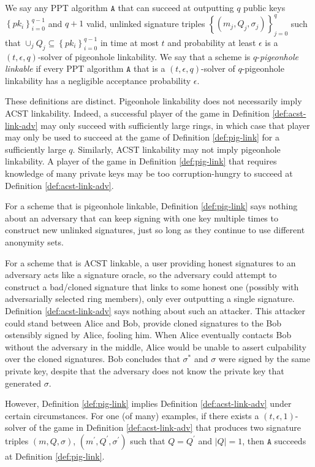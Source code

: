 \documentclass{llncs}
\begin{document}
\begin{definition}\label{def:pig-link}
We say any PPT algorithm $\texttt{A}$ that can succeed at outputting $q$ public keys $\left\{pk_i\right\}_{i=0}^{q-1}$ and $q + 1$ valid, unlinked signature triples $\left\{(m_j, Q_j, \sigma_j)\right\}_{j=0}^{q}$ such that $\cup_j Q_j \subseteq \left\{pk_i\right\}_{i=0}^{q-1}$ in time at most $t$ and probability at least $\epsilon$ is a $(t, \epsilon, q)$-solver of pigeonhole linkability. We say that a scheme is $q$-\textit{pigeonhole linkable} if every PPT algorithm $\texttt{A}$ that is a $(t, \epsilon, q)$-solver of $q$-pigeonhole linkability has a negligible acceptance probability $\epsilon$.
\end{definition}

These definitions are distinct. Pigeonhole linkability does not necessarily imply ACST linkability. Indeed, a successful player of the game in Definition \ref{def:acst-link-adv} may only succeed with sufficiently large rings, in which case that player may only be used to succeed at the game of Definition \ref{def:pig-link} for a sufficiently large $q$. Similarly, ACST linkability may not imply pigeonhole linkability. A player of the game in Definition \ref{def:pig-link} that requires knowledge of many private keys may be too corruption-hungry to succeed at Definition \ref{def:acst-link-adv}.

For a scheme that is pigeonhole linkable, Definition \ref{def:pig-link} says nothing about an adversary that can keep signing with one key multiple times to construct new unlinked signatures, just so long as they continue to use different anonymity sets.

For a scheme that is ACST linkable, a user providing honest signatures to an adversary acts like a signature oracle, so the adversary could  attempt to construct a bad/cloned signature that links to some honest one (possibly with adversarially selected ring members), only ever outputting a single signature. Definition \ref{def:acst-link-adv} says nothing about such an attacker. This attacker could stand between Alice and Bob, provide cloned signatures to the Bob ostensibly signed by Alice, fooling him. When Alice eventually contacts Bob without the adversary in the middle, Alice would be unable to assert culpability over the cloned signatures. Bob concludes that $\sigma^*$ and $\sigma$ were signed by the same private key, despite that the adversary does not know the private key that generated $\sigma$.

However, Definition \ref{def:pig-link} implies Definition \ref{def:acst-link-adv} under certain circumstances.  For one (of many) examples, if there exists a $(t, \epsilon, 1)$-solver of the game in Definition \ref{def:acst-link-adv} that produces two signature triples $(m, Q, \sigma)$, $(m^\prime, Q^\prime, \sigma^\prime)$ such that $Q = Q^\prime$ and $\left|Q\right| = 1$, then $\texttt{A}$ succeeds at Definition \ref{def:pig-link}.
\end{document}
